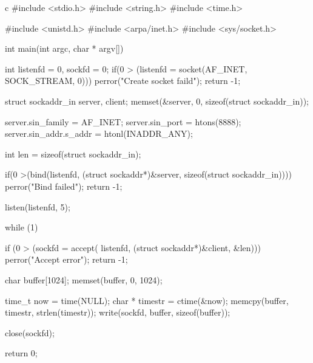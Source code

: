 \begin{code-block}{c}
#include <stdio.h>
#include <string.h>
#include <time.h>

#include <unistd.h>
#include <arpa/inet.h>
#include <sys/socket.h>

int main(int argc, char * argv[])
{

        int listenfd = 0, sockfd = 0;
        if(0 > (listenfd = socket(AF_INET, SOCK_STREAM, 0)))
        {
                perror("Create socket faild");
                return -1;
        }

        struct sockaddr_in server, client;
        memset(&server, 0, sizeof(struct sockaddr_in));

        server.sin_family = AF_INET;
        server.sin_port = htons(8888);
        server.sin_addr.s_addr = htonl(INADDR_ANY);

        int len = sizeof(struct sockaddr_in);

        if(0 >(bind(listenfd,
                (struct sockaddr*)&server, sizeof(struct sockaddr_in))))
        {
                perror("Bind failed");
                return -1;
        }

        listen(listenfd, 5);

        while (1)
        {
                if (0 > (sockfd = accept(
                        listenfd, (struct sockaddr*)&client, &len)))
                {
                        perror("Accept error");
                        return -1;
                }

                char buffer[1024];
                memset(buffer, 0, 1024);

                time_t now = time(NULL);
                char * timestr = ctime(&now);
                memcpy(buffer, timestr, strlen(timestr));
                write(sockfd, buffer, sizeof(buffer));

                close(sockfd);
        }
        return 0;
}
\end{code-block}

